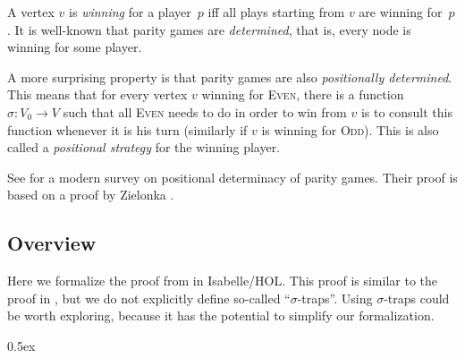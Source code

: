 \documentclass[11pt,a4paper]{scrartcl}
\newcommand{\Even}{\textsc{Even}\xspace}
\newcommand{\Odd}{\textsc{Odd}\xspace}
\begin{document}
A vertex $v$ is \emph{winning} for a player~$p$ iff all plays starting
from $v$ are winning for~$p$.  It is well-known that parity games are
\emph{determined}, that is, every node is winning for some player.

A more surprising property is that parity games are also
\emph{positionally determined}.  This means that for every vertex $v$
winning for \Even, there is a function $\sigma: V_0 \to V$ such that
all \Even needs to do in order to win from $v$ is to consult this
function whenever it is his turn (similarly if $v$ is winning for
\Odd).  This is also called a \emph{positional strategy} for the
winning player.

See \cite{automata2002/kuesters} for a modern survey on positional
determinacy of parity games.  Their proof is based on a proof by
Zielonka \cite{zielonka1998}.

\subsection{Overview}

Here we formalize the proof from \cite{kreutzer2015} in Isabelle/HOL.
This proof is similar to the proof in \cite{automata2002/kuesters},
but we do not explicitly define so-called ``$\sigma$-traps''.  Using
$\sigma$-traps could be worth exploring, because it has the potential
to simplify our formalization.



\parindent 0pt\parskip 0.5ex



\clearpage
{}
{}


\end{document}
